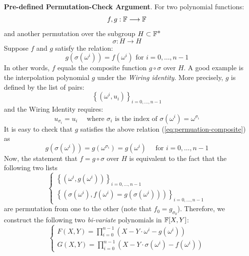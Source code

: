 \documentclass{article}
\begin{document}
\textbf{Pre-defined Permutation-Check Argument}. For two polynomial functions:
\begin{equation*}
f, g: \mathbb{F} \longrightarrow \mathbb{F}
\end{equation*}
and another permutation over the subgroup $H \subset \mathbb{F}^{\displaystyle *}$
\begin{equation*}
\sigma: H \longrightarrow H
\end{equation*}
Suppose $f$ and $g$ satisfy the relation:
\begin{equation} \label{eq:permuation-composite}
g(\sigma(\omega^i)) = f(\omega^i) \text{ for } i = 0, \dots, n-1
\end{equation}
In other words, $f$ equals the composite function $g \circ \sigma$ over $H$. A good example is the interpolation polynomial $g$ under the \textit{Wiring identity}. More precisely, $g$ is defined by the list of pairs:
\begin{equation*}
\left\{ (\omega^i, u_i) \right\}_{i = 0, \dots, n-1}
\end{equation*}
and the Wiring Identity requires:
\begin{equation*}
u_{\sigma_i} = u_i \quad \text{ where } \sigma_{i} \text{ is the index of } \sigma(\omega^i) = \omega^{\sigma_i} 
\end{equation*}
It is easy to check that $g$ satisfies the above relation (\ref{eq:permuation-composite}) as
\begin{equation*}
g(\sigma(\omega^i)) = g(\omega^{\sigma_i}) = g(\omega^i) \quad \text{ for } i = 0, \dots, n-1
\end{equation*}
Now, the statement that $f = g \circ \sigma$ over $H$ is equivalent to the fact that the following two lists 
\begin{equation*}
\begin{cases}
\left\{ (\omega^i, g(\omega^i)) \right\}_{i = 0, \dots, n-1} \\
\left\{ \left( \sigma(\omega^i), f(\omega^i) = g(\sigma(\omega^i)) \right) \right\}_{i = 0, \dots, n-1}
\end{cases}
\end{equation*}
are permutation from one to the other (note that $f_0 = g_{\sigma_0}$). Therefore, we construct the following two \textit{bi-variate} polynomials in $\mathbb{F}[X, Y]$:
\begin{equation*}
\begin{cases}
F(X, Y) = \prod_{i = 0}^{n-1} (X - Y \cdot \omega^i - g(\omega^i)) \\
G(X, Y) = \prod_{i = 0}^{n-1} (X - Y \cdot \sigma(\omega^i) - f(\omega^i)) 
\end{cases}
\end{equation*}
\end{document}
